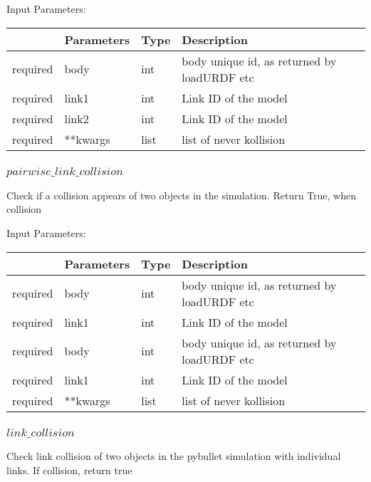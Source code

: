 \documentclass[
	ngerman,
	accentcolor=9c,%
	type=intern,
	marginpar=false
	]{tudapub}
\begin{document}
\vspace{0.5cm}
\noindent Input Parameters:
\vspace{0.5cm}

\begin{tabular}{|p{}|p{}|p{}| p{}|}
\hline
 & \textbf{Parameters} & \textbf{Type} & \textbf{Description} \\
\hline
required & body & int & body unique id, as returned by loadURDF etc\\
\hline
required & link1 &  int & Link ID of the model \\
\hline
required & link2 &  int  & Link ID of the model \\
\hline
required & **kwargs &  list & list of never kollision\\
\hline
\end{tabular}
\vspace{0.5cm}




\subsubsection{$pairwise\_link\_collision$}
\noindent Check if a collision appears of two objects in the simulation. Return True, when collision

\vspace{0.5cm}
\noindent Input Parameters:
\vspace{0.5cm}

\begin{tabular}{|p{}|p{}|p{}| p{}|}
\hline
 & \textbf{Parameters} & \textbf{Type} & \textbf{Description} \\
\hline
required & body & int & body unique id, as returned by loadURDF etc\\
\hline
required & link1 &  int & Link ID of the model \\
\hline
required & body & int & body unique id, as returned by loadURDF etc\\
\hline
required & link1 &  int & Link ID of the model \\
\hline
required & **kwargs &  list & list of never kollision\\
\hline
\end{tabular}
\vspace{0.5cm}






\subsubsection{$link\_collision$}
\noindent Check link collision of two objects in the pybullet simulation with individual links. If collision, return true
\end{document}
